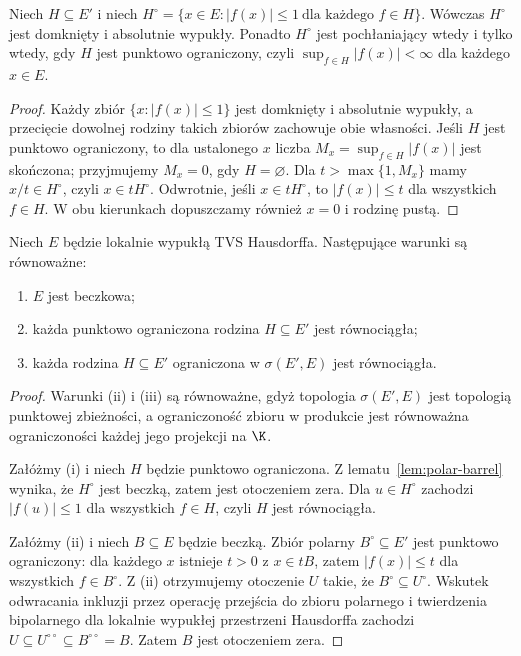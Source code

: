 \begin{lemat}\label{lem:polar-barrel}
Niech $H\subseteq E'$ i niech
$H^\circ=\{x\in E:|f(x)|\le1\ \text{dla każdego }f\in H\}$.
Wówczas $H^\circ$ jest domknięty i absolutnie wypukły.
Ponadto $H^\circ$ jest pochłaniający wtedy i tylko wtedy, gdy
$H$ jest punktowo ograniczony, czyli
$\sup_{f\in H}|f(x)|<\infty$ dla każdego $x\in E$.
\end{lemat}
\begin{proof}
Każdy zbiór $\{x:|f(x)|\le1\}$ jest domknięty i absolutnie
wypukły, a przecięcie dowolnej rodziny takich zbiorów
zachowuje obie własności. Jeśli $H$ jest punktowo ograniczony,
to dla ustalonego $x$ liczba $M_x=\sup_{f\in H}|f(x)|$
jest skończona; przyjmujemy $M_x=0$, gdy $H=\varnothing$.
Dla $t>\max\{1,M_x\}$ mamy $x/t\in H^\circ$, czyli
$x\in tH^\circ$. Odwrotnie, jeśli $x\in tH^\circ$, to
$|f(x)|\le t$ dla wszystkich $f\in H$. W obu kierunkach
dopuszczamy również $x=0$ i rodzinę pustą.
\end{proof}

\begin{twierdzenie}\label{thm:barrelled-char}
Niech $E$ będzie lokalnie wypukłą TVS Hausdorffa.
Następujące warunki są równoważne:
\begin{enumerate}[label=\textup{(\roman*)}]
\item $E$ jest beczkowa;
\item każda punktowo ograniczona rodzina $H\subseteq E'$
      jest równociągła;
\item każda rodzina $H\subseteq E'$ ograniczona w
      $\sigma(E',E)$ jest równociągła.
\end{enumerate}
\end{twierdzenie}
\begin{proof}
Warunki (ii) i (iii) są równoważne, gdyż topologia
$\sigma(E',E)$ jest topologią punktowej zbieżności,
a ograniczoność zbioru w produkcie jest równoważna
ograniczoności każdej jego projekcji na $\K$.

Załóżmy (i) i niech $H$ będzie punktowo ograniczona.
Z lematu~\ref{lem:polar-barrel} wynika, że $H^\circ$
jest beczką, zatem jest otoczeniem zera. Dla
$u\in H^\circ$ zachodzi $|f(u)|\le1$ dla wszystkich
$f\in H$, czyli $H$ jest równociągła.

Załóżmy (ii) i niech $B\subseteq E$ będzie beczką.
Zbiór polarny $B^\circ\subseteq E'$ jest punktowo ograniczony:
dla każdego $x$ istnieje $t>0$ z $x\in tB$, zatem
$|f(x)|\le t$ dla wszystkich $f\in B^\circ$.
Z (ii) otrzymujemy otoczenie $U$ takie, że
$B^\circ\subseteq U^\circ$. Wskutek odwracania inkluzji
przez operację przejścia do zbioru polarnego i twierdzenia
bipolarnego dla lokalnie wypukłej przestrzeni Hausdorffa
zachodzi
$U\subseteq U^{\circ\circ}\subseteq B^{\circ\circ}=B$.
Zatem $B$ jest otoczeniem zera.
\end{proof}

